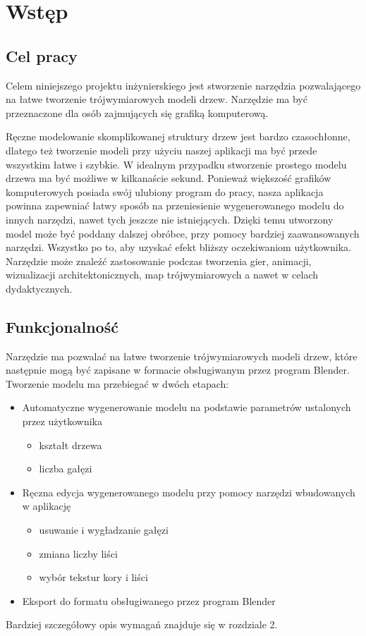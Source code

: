 \chapter{Wstęp}

\section{Cel pracy}
Celem niniejszego projektu inżynierskiego jest stworzenie narzędzia pozwalającego na łatwe 
tworzenie trójwymiarowych modeli drzew. Narzędzie ma być przeznaczone dla osób zajmujących
się grafiką komputerową.

Ręczne modelowanie skomplikowanej struktury drzew jest bardzo czasochłonne,
dlatego też tworzenie modeli przy użyciu naszej aplikacji ma być przede wszystkim łatwe i szybkie.
W idealnym przypadku stworzenie prostego modelu drzewa ma być możliwe w kilkanaście sekund. Ponieważ większość
grafików komputerowych posiada swój ulubiony program do pracy, nasza aplikacja powinna zapewniać
łatwy sposób na przeniesienie wygenerowanego modelu do innych narzędzi, nawet tych jeszcze nie istniejących.
Dzięki temu utworzony model może być poddany dalszej obróbce, przy pomocy bardziej zaawansowanych narzędzi. Wszystko po to, aby uzyskać
efekt bliższy oczekiwaniom użytkownika.
\\ \indent Narzędzie może znaleźć zastosowanie podczas tworzenia gier, animacji, wizualizacji architektonicznych, map trójwymiarowych a nawet w celach dydaktycznych.


\newpage
\section{Funkcjonalność}
Narzędzie ma pozwalać na łatwe tworzenie trójwymiarowych modeli drzew, które następnie mogą być zapisane
w formacie obsługiwanym przez program Blender. Tworzenie modelu ma przebiegać w dwóch etapach:
\begin{itemize}
	\item{Automatyczne wygenerowanie modelu na podstawie parametrów ustalonych przez użytkownika}
	\begin{itemize}
		\item{kształt drzewa}
		\item{liczba gałęzi}
	\end{itemize}
	\item{Ręczna edycja wygenerowanego modelu przy pomocy narzędzi wbudowanych w aplikację}
	\begin{itemize}
		\item{usuwanie  i wygładzanie gałęzi}
		\item{zmiana liczby liści}
		\item{wybór tekstur kory i liści}
	\end{itemize}

	\item{Eksport do formatu obsługiwanego przez program Blender}
\end{itemize}
Bardziej szczegółowy opis wymagań znajduje się w rozdziale 2.


